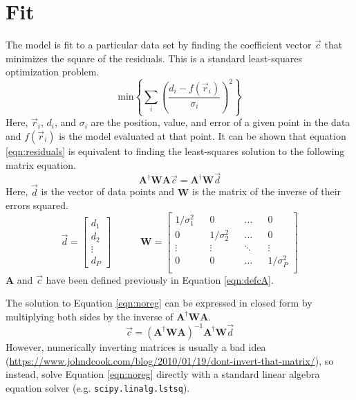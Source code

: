 \documentclass[12pt,letterpaper]{article}
\newcommand{\mat}[1]{\mathbf{#1}}
\newcommand{\plaintext}[1]{\texttt{#1}}
\begin{document}
\section{Fit}
  The model is fit to a particular data set by finding the coefficient vector \(\vec{c}\) that minimizes the square of the residuals.  This is a standard least-squares optimization problem.
  \begin{equation}
    \label{eqn:residuals}
    \text{min}\left\{\sum_i\left(\frac{d_i-f(\vec{r}_i)}{\sigma_i}\right)^2\right\}
  \end{equation}
  Here, \(\vec{r}_i\), \(d_i\), and \(\sigma_i\) are the position, value, and error of a given point in the data and \(f(\vec{r}_i)\) is the model evaluated at that point.  It can be shown that equation \ref{eqn:residuals} is equivalent to finding the least-squares solution to the following matrix equation.
  \begin{equation}
    \label{eqn:noreg}
    \mat{A}^\dagger\mat{W}\mat{A}\vec{c} = \mat{A}^\dagger\mat{W}\vec{d}
  \end{equation}
  Here, \(\vec{d}\) is the vector of data points and \(\mat{W}\) is the matrix of the inverse of their errors squared.
  \begin{equation}
    \vec{d} = \begin{bmatrix}
                d_1 \\
                d_2 \\
                \vdots \\
                d_P
              \end{bmatrix} \quad\quad\quad
    \mat{W} = \begin{bmatrix}
                1/\sigma_1^2 && 0 && \hdots && 0 \\
                0 && 1/\sigma_2^2 && \hdots && 0 \\
                \vdots && \vdots && \ddots && \vdots \\
                0 && 0 && \hdots && 1/\sigma_P^2 \\
              \end{bmatrix}
  \end{equation}
  \(\mat{A}\) and \(\vec{c}\) have been defined previously in Equation \ref{eqn:defcA}.

  The solution to Equation \ref{eqn:noreg} can be expressed in closed form by multiplying both sides by the inverse of \(\mat{A}^\dagger\mat{W}\mat{A}\).
  \begin{equation}
    \vec{c} = (\mat{A}^\dagger\mat{W}\mat{A})^{-1}\mat{A}^\dagger\mat{W}\vec{d}
  \end{equation}
  However, numerically inverting matrices is usually a bad idea (\url{https://www.johndcook.com/blog/2010/01/19/dont-invert-that-matrix/}), so instead, solve Equation \ref{eqn:noreg} directly with a standard linear algebra equation solver (e.g. \plaintext{scipy.linalg.lstsq}).
\end{document}
